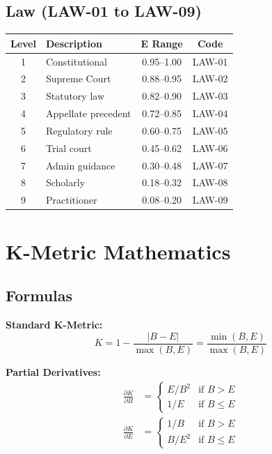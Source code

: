 \documentclass[11pt,a4paper]{article}
\begin{document}
\subsection{Law (LAW-01 to LAW-09)}

\begin{center}
\begin{tabular}{clcc}
\toprule
\textbf{Level} & \textbf{Description} & \textbf{E Range} & \textbf{Code} \\
\midrule
1 & Constitutional & 0.95--1.00 & LAW-01 \\
2 & Supreme Court & 0.88--0.95 & LAW-02 \\
3 & Statutory law & 0.82--0.90 & LAW-03 \\
4 & Appellate precedent & 0.72--0.85 & LAW-04 \\
5 & Regulatory rule & 0.60--0.75 & LAW-05 \\
6 & Trial court & 0.45--0.62 & LAW-06 \\
7 & Admin guidance & 0.30--0.48 & LAW-07 \\
8 & Scholarly & 0.18--0.32 & LAW-08 \\
9 & Practitioner & 0.08--0.20 & LAW-09 \\
\bottomrule
\end{tabular}
\end{center}

\newpage
\section{K-Metric Mathematics}

\subsection{Formulas}

\textbf{Standard K-Metric:}
\begin{equation}
K = 1 - \frac{|B - E|}{\max(B, E)} = \frac{\min(B, E)}{\max(B, E)}
\end{equation}

\textbf{Partial Derivatives:}
\begin{align}
\frac{\partial K}{\partial B} &= \begin{cases} E/B^2 & \text{if } B > E \\ 1/E & \text{if } B \leq E \end{cases} \\
\frac{\partial K}{\partial E} &= \begin{cases} 1/B & \text{if } B > E \\ B/E^2 & \text{if } B \leq E \end{cases}
\end{align}
\end{document}
